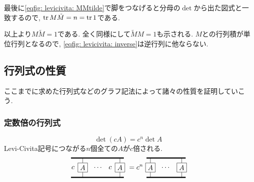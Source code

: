 \documentclass[dvipdfmx]{jsarticle}
\begin{document}
最後に\eqref{eqfig: levicivita: MMtilde}で脚をつなげると分母の$\det$から出た図式と一致するので, $\tr M\tilde{M}=n=\tr 1$である.

以上より$M\tilde{M}=1$である.
全く同様にして$\tilde{M}M=1$も示される.
$M$との行列積が単位行列となるので, \eqref{eqfig: levicivita: inverse}は逆行列に他ならない.


\subsection{行列式の性質}
\label{sec: matrix: properties of determinant}

ここまでに求めた行列式などのグラフ記法によって諸々の性質を証明していこう.

\subsubsection{定数倍の行列式}

\begin{equation*}
    \det(cA)=c^n\det A
\end{equation*}
Levi-Civita記号につながる$n$個全ての$A$が$c$倍される.
\begin{equation*}
    \vcenter{\hbox{
        \begin{tikzpicture}
            \draw[ultra thick](0,0)--++(2.7,0);
            \draw[ultra thick](0,-1)--++(2.7,0);
            \node at(.1,-.5)[anchor=center]{$c$};
            \node at(2,-.5)[anchor=center]{$c$};
            \draw
                (.6,0)--++(0,-.25)
                node[anchor=north,draw,rectangle](A1){$A$}
                (A1.south)--++(0,-.25)
                (2.5,0)--++(0,-.25)
                node[anchor=north,draw,rectangle](A2){$A$}
                (A2.south)--++(0,-.25)
            ;
            \node at(1.4,-.5)[anchor=center]{$\cdots$};
        \end{tikzpicture}
    }}
    =
    c^n
    \vcenter{\hbox{
        \begin{tikzpicture}
            \coordinate(O1)at(0,0);
            \coordinate(O2)at(0,-1);
            \draw[ultra thick]
                (O1)--++(2,0)
                (O2)--++(2,0)
            ;
            \draw
                (O1)++(.2,0)--++(0,-.25)
                node[anchor=north, draw, rectangle](B1){$A$}
                (O2)++(.2,0)--(B1.south)
                (O1)++(1.8,0)--++(0,-.25)
                node[anchor=north, draw, rectangle](B2){$A$}
                (O2)++(1.8,0)--(B2.south)
                (O1)++(1,0)++(0,-.5)
                node[anchor=center]{$\cdots$}
            ;
        \end{tikzpicture}
    }}
\end{equation*}
\end{document}
